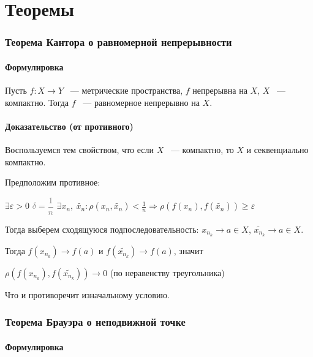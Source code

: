 \documentclass{article}
\begin{document}
\newpage
	
\part{Теоремы}

	\newpage
	
	\section{Теорема Кантора о равномерной непрерывности}
	
        \subsection{Формулировка}
        
            Пусть $f: X \rightarrow Y$ ~--- метрические пространства, $f$ непрерывна на $X$, $X$ ~--- компактно. Тогда $f$ ~--- равномерное непрерывно на $X$.
		
		\subsection{Доказательство (от противного)}
		
			Воспользуемся тем свойством, что если $X$ ~--- компактно, то $X$ и секвенциально компактно.
			
			Предположим противное:
			
			$\exists \varepsilon > 0$ \textcolor{gray}{$\delta = \dfrac{1}{n}$} $\exists x_n, \ \widetilde{x_n} : \rho(x_n, \widetilde{x_n}) < \frac{1}{n} \Rightarrow \rho(f(x_n), f(\widetilde{x_n})) \geq \varepsilon$
			
			Тогда выберем сходящуюся подпоследовательность: $x_{n_k} \rightarrow a \in X$, $\widetilde{x_{n_k}} \rightarrow a \in X$.
			
			Тогда $f(x_{n_k}) \rightarrow f(a)$ и $f(\widetilde{x_{n_k}}) \rightarrow f(a)$, значит
			
			$\rho(f(x_{n_k}), f(\widetilde{x_{n_k}})) \rightarrow 0$ (по неравенству треугольника)
			
			Что и противоречит изначальному условию.

	\newpage
	
	\section{Теорема Брауэра о неподвижной точке}
	
		\subsection{Формулировка}
            
\end{document}
